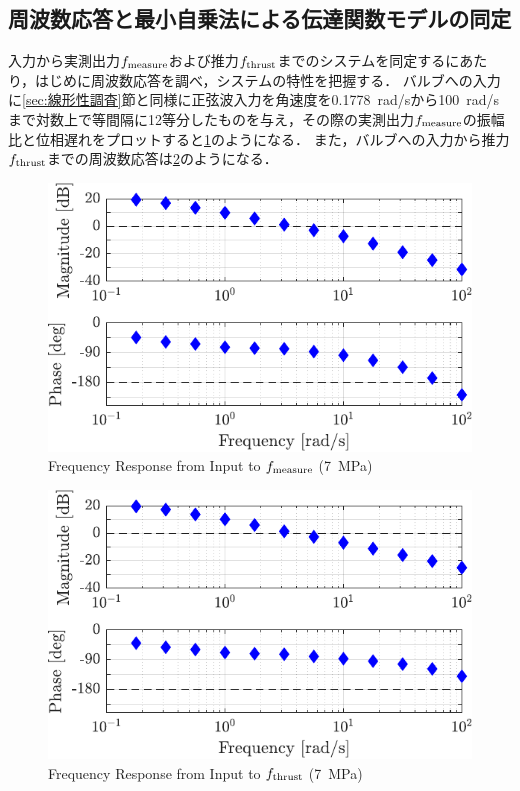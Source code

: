 \subsection{周波数応答と最小自乗法による伝達関数モデルの同定}
入力から実測出力$f_\mathrm{measure}$および推力$f_\mathrm{thrust}$までのシステムを同定するにあたり，はじめに周波数応答を調べ，システムの特性を把握する．
バルブへの入力に\ref{sec:線形性調査}節と同様に正弦波入力を角速度を\SI{0.1778}{rad/s}から\SI{100}{rad/s}まで対数上で等間隔に12等分したものを与え，その際の実測出力$f_\mathrm{measure}$の振幅比と位相遅れをプロットすると\figname\ref{fig:crop-1018_manubode_in2fmea_7MPa}のようになる．
また，バルブへの入力から推力$f_\mathrm{thrust}$までの周波数応答は\figname\ref{fig:crop-1018_manubode_in2fthr_7MPa}のようになる．
\begin{figure}[t]
    \centering
        \includegraphics[keepaspectratio, scale=1.0]{contents/システム同定/figure/crop-1018_manubode_in2fmea_7MPa.pdf}
        \caption{Frequency Response from Input to $f_\mathrm{measure}$ (\SI{7}{MPa})}
        \label{fig:crop-1018_manubode_in2fmea_7MPa}
\end{figure}
\begin{figure}[t]
    \centering
        \includegraphics[keepaspectratio, scale=1.0]{contents/システム同定/figure/crop-1018_manubode_in2fthr_7MPa.pdf}
        \caption{Frequency Response from Input to $f_\mathrm{thrust}$ (\SI{7}{MPa})}
        \label{fig:crop-1018_manubode_in2fthr_7MPa}
\end{figure}

